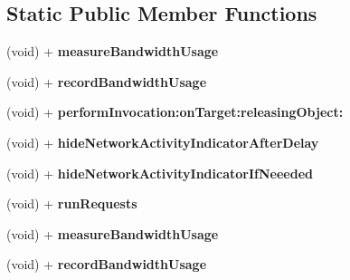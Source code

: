 \subsection*{\-Static \-Public \-Member \-Functions}
\begin{DoxyCompactItemize}
\item 
\hypertarget{interface_a_s_i_h_t_t_p_request_07_08_ae002cae4049589d09b529b25d0a4df61}{
(void) + {\bfseries measure\-Bandwidth\-Usage}}
\label{interface_a_s_i_h_t_t_p_request_07_08_ae002cae4049589d09b529b25d0a4df61}

\item 
\hypertarget{interface_a_s_i_h_t_t_p_request_07_08_a9bfa27b53cfee20fcb4353aaa1fe015b}{
(void) + {\bfseries record\-Bandwidth\-Usage}}
\label{interface_a_s_i_h_t_t_p_request_07_08_a9bfa27b53cfee20fcb4353aaa1fe015b}

\item 
\hypertarget{interface_a_s_i_h_t_t_p_request_07_08_ac5f0757b7a71e70cee7a93dd7e9ee9f8}{
(void) + {\bfseries perform\-Invocation\-:on\-Target\-:releasing\-Object\-:}}
\label{interface_a_s_i_h_t_t_p_request_07_08_ac5f0757b7a71e70cee7a93dd7e9ee9f8}

\item 
\hypertarget{interface_a_s_i_h_t_t_p_request_07_08_a8b784d38e3706dbbce3d956bfe8c4d11}{
(void) + {\bfseries hide\-Network\-Activity\-Indicator\-After\-Delay}}
\label{interface_a_s_i_h_t_t_p_request_07_08_a8b784d38e3706dbbce3d956bfe8c4d11}

\item 
\hypertarget{interface_a_s_i_h_t_t_p_request_07_08_a60cd7d715f73401f380a650c2257d32b}{
(void) + {\bfseries hide\-Network\-Activity\-Indicator\-If\-Neeeded}}
\label{interface_a_s_i_h_t_t_p_request_07_08_a60cd7d715f73401f380a650c2257d32b}

\item 
\hypertarget{interface_a_s_i_h_t_t_p_request_07_08_a3948708d5250dec349a05e2d5d943ba0}{
(void) + {\bfseries run\-Requests}}
\label{interface_a_s_i_h_t_t_p_request_07_08_a3948708d5250dec349a05e2d5d943ba0}

\item 
\hypertarget{interface_a_s_i_h_t_t_p_request_07_08_ae002cae4049589d09b529b25d0a4df61}{
(void) + {\bfseries measure\-Bandwidth\-Usage}}
\label{interface_a_s_i_h_t_t_p_request_07_08_ae002cae4049589d09b529b25d0a4df61}

\item 
\hypertarget{interface_a_s_i_h_t_t_p_request_07_08_a9bfa27b53cfee20fcb4353aaa1fe015b}{
(void) + {\bfseries record\-Bandwidth\-Usage}}
\label{interface_a_s_i_h_t_t_p_request_07_08_a9bfa27b53cfee20fcb4353aaa1fe015b}


\end{DoxyCompactItemize}
